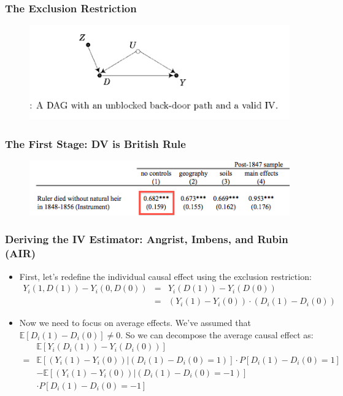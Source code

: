 \documentclass{beamer}
\begin{document}
\begin{frame}
  \frametitle{The Exclusion Restriction}
  \begin{figure}[t]
    \centering
      \includegraphics[scale=.7]{DAG}
 \end{figure}
\end{frame}

\begin{frame}
  \frametitle{The First Stage: DV is British Rule}
  \begin{figure}[t]
    \centering
      \includegraphics[scale=.7]{first_stage}
 \end{figure}
\end{frame}

\begin{frame}
  \frametitle{Deriving the IV Estimator: Angrist, Imbens, and Rubin (AIR)}
  \begin{itemize}
  \item First, let's redefine the individual causal effect using the
    exclusion restriction:
\begin{eqnarray*}
Y_i(1,D(1))-Y_i(0,D(0))& =& Y_i(D(1))-Y_i(D(0))  \\
&=& (Y_i(1)-Y_i(0))\cdot (D_i(1)-D_i(0))
\end{eqnarray*}
\item Now we need to focus on average effects. We've assumed that
  $\mathbb{E}[D_i(1)-D_i(0)] \neq 0$. So we can decompose the average
  causal effect as:
  \begin{eqnarray*}
   & \mathbb{E}[Y_i(D_i(1))-Y_i(D_i(0))] \\
 = & \mathbb{E}[(Y_i(1)-Y_i(0))|(D_i(1)-D_i(0)=1)] \cdot
 P[D_i(1)-D_i(0)=1] \\
&-\mathbb{E}[(Y_i(1)-Y_i(0))|(D_i(1)-D_i(0)=-1)] \\ 
&\cdot
 P[D_i(1)-D_i(0)=-1]
  \end{eqnarray*}
  \end{itemize}
\end{frame}
\end{document}
